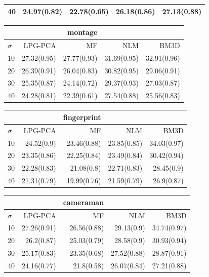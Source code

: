 {\begin{minipage}{.5\linewidth}
\begin{tabular}{lrrrr}
40&24.97(0.82)&22.78(0.65)&26.18(0.86)&27.13(0.88)\\
\bottomrule
\end{tabular}
\end{minipage}
\noindent\begin{minipage}{.5\linewidth}
\begin{tabular}{lrrrr}
\toprule &&montage\\ \midrule
$\sigma$&LPG-PCA&MF&NLM&BM3D\\
\midrule
10&27.32(0.95)&27.77(0.93)&31.69(0.95)&32.91(0.96)\\
20&26.39(0.91)&26.04(0.83)&30.82(0.95)&29.06(0.91)\\
30&25.35(0.87)&24.14(0.72)&29.37(0.93)&27.03(0.87)\\
40&24.28(0.81)&22.39(0.61)&27.54(0.88)&25.56(0.83)\\
\bottomrule
\end{tabular}
\end{minipage}
\noindent\begin{minipage}{.5\linewidth}
\begin{tabular}{lrrrr}
\toprule &&fingerprint\\ \midrule
$\sigma$&LPG-PCA&MF&NLM&BM3D\\
\midrule
10&24.52(0.9)&23.46(0.88)&23.85(0.85)&34.03(0.97)\\
20&23.35(0.86)&22.25(0.84)&23.49(0.84)&30.42(0.94)\\
30&22.28(0.83)&21.08(0.8)&22.71(0.83)&28.45(0.9)\\
40&21.31(0.79)&19.99(0.76)&21.59(0.79)&26.9(0.87)\\
\bottomrule
\end{tabular}
\end{minipage}
\noindent\begin{minipage}{.5\linewidth}
\begin{tabular}{lrrrr}
\toprule &&cameraman\\ \midrule
$\sigma$&LPG-PCA&MF&NLM&BM3D\\
\midrule
10&27.26(0.91)&26.56(0.88)&29.13(0.9)&34.74(0.97)\\
20&26.2(0.87)&25.03(0.79)&28.58(0.9)&30.93(0.94)\\
30&25.17(0.83)&23.35(0.68)&27.52(0.88)&28.87(0.91)\\
40&24.16(0.77)&21.8(0.58)&26.07(0.84)&27.21(0.88)\\
\bottomrule
\end{tabular}
\end{minipage}
\noindent\begin{minipage}{.5\linewidth}

\end{minipage}}
